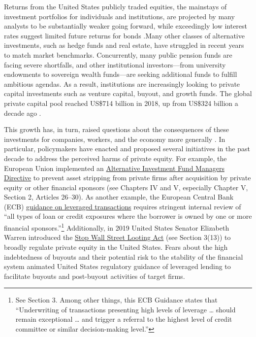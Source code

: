 \documentclass[
]{book}
\begin{document}
Returns from the United States publicly traded equities, the mainstays of investment portfolios for individuals and institutions, are projected by many analysts to be substantially weaker going forward, while exceedingly low interest rates suggest limited future returns for bonds \citep{perianan2020}.Many other classes of alternative investments, such as hedge funds and real estate, have struggled in recent years to match market benchmarks. Concurrently, many public pension funds are facing severe shortfalls, and other institutional investors---from university endowments to sovereign wealth funds---are seeking additional funds to fulfill ambitious agendas. As a result, institutions are increasingly looking to private capital investments such as venture capital, buyout, and growth funds. The global private capital pool reached US\$714 billion in 2018, up from US\$324 billion a decade ago \citep{baincompany2019}.

This growth has, in turn, raised questions about the consequences of these investments for companies, workers, and the economy more generally \citep{privatecapitalresearchinstitute2017}. In particular, policymakers have enacted and proposed several initiatives in the past decade to address the perceived harms of private equity. For example, the European Union implemented an \href{https://eur-lex.europa.eu/legal-content/EN/TXT/PDF/?uri=CELEX:32011L0061\&from=EN}{Alternative Investment Fund Managers Directive} to prevent asset stripping from private firms after acquisition by private equity or other financial sponsors (see Chapters IV and V, especially Chapter V, Section 2, Articles 26--30). As another example, the European Central Bank (ECB) \href{https://www.bankingsupervision.europa.eu/ecb/pub/pdf/ssm.leveraged_transactions_guidance_201705.en.pdf}{guidance on leveraged transactions} requires stringent internal review of ``all types of loan or credit exposures where the borrower is owned by one or more financial sponsors.''\footnote{See Section 3. Among other things, this ECB Guidance states that ``Underwriting of transactions presenting high levels of leverage \ldots{} should remain exceptional \ldots{} and trigger a referral to the highest level of credit committee or similar decision-making level.''} Additionally, in 2019 United States Senator Elizabeth Warren introduced the \href{https://www.warren.senate.gov/imo/media/doc/2019.7.17\%20Stop\%20Wall\%20Street\%20Looting\%20Act\%20Text.pdf}{Stop Wall Street Looting Act} (see Section 3(13)) to broadly regulate private equity in the United States. Fears about the high indebtedness of buyouts and their potential risk to the stability of the financial system animated United States regulatory guidance of leveraged lending to facilitate buyouts and post-buyout activities of target firms.
\end{document}
